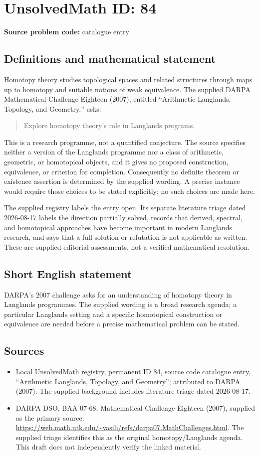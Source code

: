 \documentclass[11pt]{article}
\begin{document}
\section*{UnsolvedMath ID: 84}
\textbf{Source problem code:} catalogue entry
\subsection{Definitions and mathematical statement}
Homotopy theory studies topological spaces and related structures through maps up to homotopy and suitable notions of weak equivalence. The supplied DARPA Mathematical Challenge Eighteen (2007), entitled ``Arithmetic Langlands, Topology, and Geometry,'' asks:
\begin{quote}
Explore homotopy theory's role in Langlands programs.
\end{quote}
This is a research programme, not a quantified conjecture. The source specifies neither a version of the Langlands programme nor a class of arithmetic, geometric, or homotopical objects, and it gives no proposed construction, equivalence, or criterion for completion. Consequently no definite theorem or existence assertion is determined by the supplied wording. A precise instance would require those choices to be stated explicitly; no such choices are made here.

The supplied registry labels the entry open. Its separate literature triage dated 2026-08-17 labels the direction partially solved, records that derived, spectral, and homotopical approaches have become important in modern Langlands research, and says that a full solution or refutation is not applicable as written. These are supplied editorial assessments, not a verified mathematical resolution.
\subsection{Short English statement}
DARPA's 2007 challenge asks for an understanding of homotopy theory in Langlands programmes. The supplied wording is a broad research agenda; a particular Langlands setting and a specific homotopical construction or equivalence are needed before a precise mathematical problem can be stated.
\subsection{Sources}
\begin{itemize}
\item Local UnsolvedMath registry, permanent ID 84, source code catalogue entry, ``Arithmetic Langlands, Topology, and Geometry''; attributed to DARPA (2007). The supplied background includes literature triage dated 2026-08-17.
\item DARPA DSO, BAA 07-68, Mathematical Challenge Eighteen (2007), supplied as the primary source: \url{https://web.math.utk.edu/~vasili/refs/darpa07.MathChallenges.html}. The supplied triage identifies this as the original homotopy/Langlands agenda. This draft does not independently verify the linked material.
\end{itemize}
\end{document}
